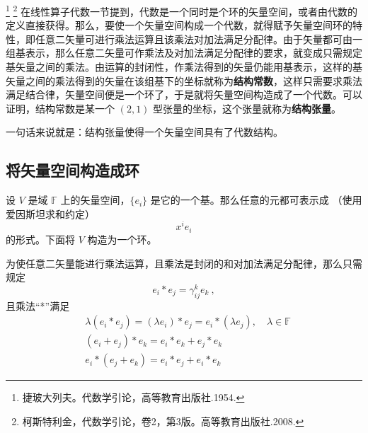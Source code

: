 
\footnote{捷玻大列夫。代数学引论，高等教育出版社.1954.}
\footnote{柯斯特利金，代数学引论，卷2，第3版。高等教育出版社.2008.} 在线性算子代数一节提到，代数是一个同时是个环的矢量空间，或者由代数的定义直接获得。那么，要使一个矢量空间构成一个代数，就得赋予矢量空间环的特性，即任意二矢量可进行乘法运算且该乘法对加法满足分配律。由于矢量都可由一组基表示，那么任意二矢量可作乘法及对加法满足分配律的要求，就变成只需规定基矢量之间的乘法。由运算的封闭性，作乘法得到的矢量仍能用基表示，这样的基矢量之间的乘法得到的矢量在该组基下的坐标就称为\textbf{结构常数}，这样只需要求乘法满足结合律，矢量空间便是一个环了，于是就将矢量空间构造成了一个代数。可以证明，结构常数是某一个 $(2,1)$ 型张量的坐标，这个张量就称为\textbf{结构张量}。 

一句话来说就是：结构张量使得一个矢量空间具有了代数结构。

\subsection{将矢量空间构造成环}
设 $V$ 是域 $\mathbb F$ 上的矢量空间，$\{e_i\}$ 是它的一个基。那么任意的元都可表示成 （使用爱因斯坦求和约定）
\begin{equation}
x^i e_i
\end{equation}
的形式。下面将 $V$ 构造为一个环。

为使任意二矢量能进行乘法运算，且乘法是封闭的和对加法满足分配律，那么只需规定
\begin{equation}\label{STAlg_eq1}
e_i*e_j=\gamma_{ij}^k e_k~,
\end{equation}
且乘法“*”满足
\begin{equation}
\begin{aligned}
&\lambda(e_i*e_j)=(\lambda e_i)*e_j=e_i*(\lambda e_j),\quad \lambda\in\mathbb F\\
&(e_i+e_j)*e_k=e_i*e_k+e_j*e_k\\
&e_i*(e_j+e_k)=e_i*e_j+e_i*e_k
\end{aligned}
\end{equation}

